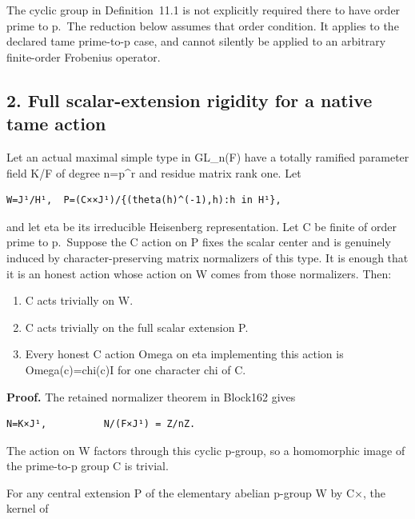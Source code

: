 The cyclic group in Definition~11.1 is not explicitly required there to
have order prime to p.~The reduction below assumes that order condition. It applies to the declared tame prime-to-p case, and cannot silently be
applied to an arbitrary finite-order Frobenius operator.

\hypertarget{stabilizer_contract-full-scalar-extension-rigidity-for-a-native-tame-action}{%
\subsection{2. Full scalar-extension rigidity for a native tame
action}\label{stabilizer_contract-full-scalar-extension-rigidity-for-a-native-tame-action}}

Let an actual maximal simple type in GL\_n(F) have a totally ramified
parameter field K/F of degree n=p\^{}r and residue matrix rank one. Let

\begin{Verbatim}[fontsize=\small,breaklines=true,breakanywhere=true]
W=J¹/H¹,  P=(C××J¹)/{(theta(h)^(-1),h):h in H¹},
\end{Verbatim}

and let eta be its irreducible Heisenberg representation. Let C be
finite of order prime to p.~Suppose the C action on P fixes the scalar
center and is genuinely induced by character-preserving matrix
normalizers of this type. It is enough that it is an honest action whose
action on W comes from those normalizers. Then:

\begin{enumerate}
\def\labelenumi{\arabic{enumi}.}
\tightlist
\item
  C acts trivially on W.
\item
  C acts trivially on the full scalar extension P.
\item
  Every honest C action Omega on eta implementing this action is
  Omega(c)=chi(c)I for one character chi of C.
\end{enumerate}

\textbf{Proof.} The retained normalizer theorem in Block162 gives

\begin{Verbatim}[fontsize=\small,breaklines=true,breakanywhere=true]
N=K×J¹,          N/(F×J¹) = Z/nZ.
\end{Verbatim}

The action on W factors through this cyclic p-group, so a homomorphic
image of the prime-to-p group C is trivial.

For any central extension P of the elementary abelian p-group W by C×,
the kernel of

